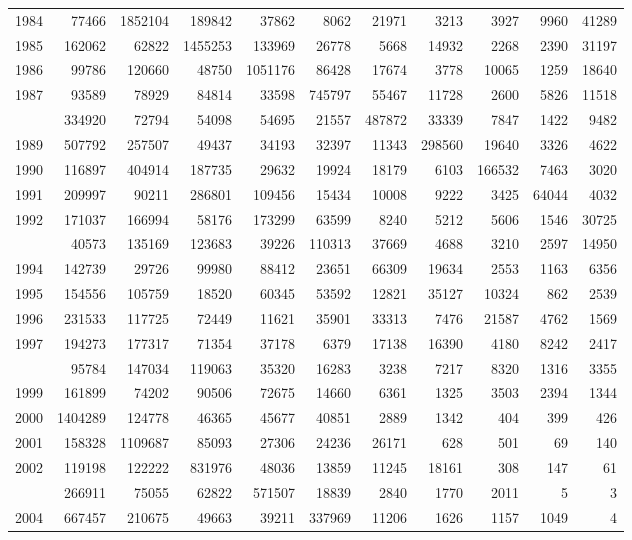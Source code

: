 \documentclass[
]{article}
\begin{document}
\begin{longtable}[t]{lrrrrrrrrrr}
1984 & 77466 & 1852104 & 189842 & 37862 & 8062 & 21971 & 3213 & 3927 & 9960 & 41289\\
1985 & 162062 & 62822 & 1455253 & 133969 & 26778 & 5668 & 14932 & 2268 & 2390 & 31197\\
1986 & 99786 & 120660 & 48750 & 1051176 & 86428 & 17674 & 3778 & 10065 & 1259 & 18640\\
1987 & 93589 & 78929 & 84814 & 33598 & 745797 & 55467 & 11728 & 2600 & 5826 & 11518\\
\addlinespace
1988 & 334920 & 72794 & 54098 & 54695 & 21557 & 487872 & 33339 & 7847 & 1422 & 9482\\
1989 & 507792 & 257507 & 49437 & 34193 & 32397 & 11343 & 298560 & 19640 & 3326 & 4622\\
1990 & 116897 & 404914 & 187735 & 29632 & 19924 & 18179 & 6103 & 166532 & 7463 & 3020\\
1991 & 209997 & 90211 & 286801 & 109456 & 15434 & 10008 & 9222 & 3425 & 64044 & 4032\\
1992 & 171037 & 166994 & 58176 & 173299 & 63599 & 8240 & 5212 & 5606 & 1546 & 30725\\
\addlinespace
1993 & 40573 & 135169 & 123683 & 39226 & 110313 & 37669 & 4688 & 3210 & 2597 & 14950\\
1994 & 142739 & 29726 & 99980 & 88412 & 23651 & 66309 & 19634 & 2553 & 1163 & 6356\\
1995 & 154556 & 105759 & 18520 & 60345 & 53592 & 12821 & 35127 & 10324 & 862 & 2539\\
1996 & 231533 & 117725 & 72449 & 11621 & 35901 & 33313 & 7476 & 21587 & 4762 & 1569\\
1997 & 194273 & 177317 & 71354 & 37178 & 6379 & 17138 & 16390 & 4180 & 8242 & 2417\\
\addlinespace
1998 & 95784 & 147034 & 119063 & 35320 & 16283 & 3238 & 7217 & 8320 & 1316 & 3355\\
1999 & 161899 & 74202 & 90506 & 72675 & 14660 & 6361 & 1325 & 3503 & 2394 & 1344\\
2000 & 1404289 & 124778 & 46365 & 45677 & 40851 & 2889 & 1342 & 404 & 399 & 426\\
2001 & 158328 & 1109687 & 85093 & 27306 & 24236 & 26171 & 628 & 501 & 69 & 140\\
2002 & 119198 & 122222 & 831976 & 48036 & 13859 & 11245 & 18161 & 308 & 147 & 61\\
\addlinespace
2003 & 266911 & 75055 & 62822 & 571507 & 18839 & 2840 & 1770 & 2011 & 5 & 3\\
2004 & 667457 & 210675 & 49663 & 39211 & 337969 & 11206 & 1626 & 1157 & 1049 & 4\\

\end{longtable}
\end{document}
